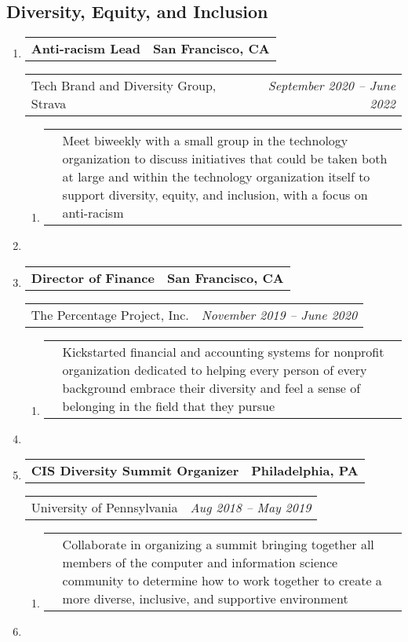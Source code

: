 \documentclass[letterpaper]{article}
\makeatletter
\newcommand*{\tabulardef}[3]{\begin{tabular}[t]{@{}lp{\dimexpr\linewidth-#1}@{}}
    #2&#3
\end{tabular}}
\newcommand{\headerrow}[2]
{\begin{tabular*}{\linewidth}{l@{\extracolsep{\fill}}r}
	#1 &
	#2 \\
\end{tabular*}}
\makeatother
\begin{document}
\subsection*{Diversity, Equity, and Inclusion}
\begin{enumerate}[label=]
	\parskip=-0.25em
	\item
		\headerrow
			{\textbf{Anti-racism Lead}}
			{\textbf{San Francisco, CA}}
	\headerrow
		{Tech Brand and Diversity Group, Strava}
		{\emph{September 2020 -- June 2022}}
	\begin{enumerate}[label= *]
	\parskip=-0.1em
		\item\tabulardef{5cm}{}{Meet biweekly with a small group in the technology organization to discuss initiatives that could be taken both at large and within the technology organization itself to support diversity, equity, and inclusion, with a focus on anti-racism}
	\end{enumerate}

    \item
 
	\item
		\headerrow
			{\textbf{Director of Finance}}
			{\textbf{San Francisco, CA}}
	\headerrow
		{The Percentage Project, Inc.}
		{\emph{November 2019 -- June 2020}}
	\begin{enumerate}[label= *]
	\parskip=-0.1em
		\item\tabulardef{5cm}{}{Kickstarted financial and accounting systems for nonprofit organization dedicated to helping every person of every background embrace their diversity and feel a sense of belonging in the field that they pursue}
	\end{enumerate}

    \item

	\item
		\headerrow
			{\textbf{CIS Diversity Summit Organizer}}
			{\textbf{Philadelphia, PA}}
	\headerrow
		{University of Pennsylvania}
		{\emph{Aug 2018 -- May 2019}}
	\begin{enumerate}[label= *]
	\parskip=-0.1em
		\item\tabulardef{5cm}{}{Collaborate in organizing a summit bringing together all members of the computer and information science community to determine how to work together to create a more diverse, inclusive, and supportive environment}
	\end{enumerate}

    \item


\end{enumerate}
\end{document}
